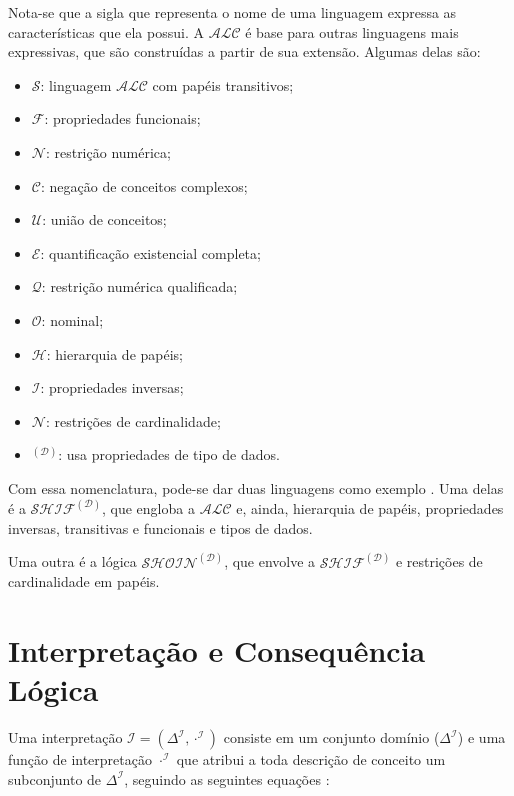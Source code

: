 Nota-se que a sigla que representa o nome de uma linguagem expressa as características que ela possui.
A $ \mathcal{ALC} $ é base para outras linguagens mais expressivas, que são construídas a partir de sua extensão. Algumas delas são:

\begin{itemize}
	\item $ \mathcal{S} $: linguagem $ \mathcal{ALC} $ com papéis transitivos;
	\item $ \mathcal{F} $: propriedades funcionais;
	\item $ \mathcal{N} $: restrição numérica;
	\item $ \mathcal{C} $: negação de conceitos complexos;
	\item $ \mathcal{U} $: união de conceitos;
	\item $ \mathcal{E} $: quantificação existencial completa;
	\item $ \mathcal{Q} $: restrição numérica qualificada;
	\item $ \mathcal{O} $: nominal;
	\item $ \mathcal{H} $: hierarquia de papéis;
	\item $ \mathcal{I} $: propriedades inversas;
	\item $ \mathcal{N} $: restrições de cardinalidade;
	\item $ ^\mathcal{(D)} $: usa propriedades de tipo de dados.
\end{itemize}

Com essa nomenclatura, pode-se dar duas linguagens como exemplo \citep{logicaResina}. Uma delas é a $ \mathcal{SHIF}^\mathcal{(D)} $, que engloba a $ \mathcal{ALC} $ e, ainda, hierarquia de papéis, propriedades inversas, transitivas e funcionais e tipos de dados.

Uma outra é a lógica $ \mathcal{SHOIN}^\mathcal{(D)}$, que envolve a  $ \mathcal{SHIF}^\mathcal{(D)} $ e restrições de cardinalidade em papéis.

\section{Interpretação e Consequência Lógica}

Uma interpretação $ \mathcal{I} = (\Delta^{\mathcal{I}}, \cdot^{\mathcal{I}})$ consiste em um conjunto domínio ($ \Delta^{\mathcal{I}} $) e uma função de interpretação $ \cdot^{\mathcal{I}} $ que atribui a toda descrição de conceito um subconjunto de $ \Delta^{\mathcal{I}} $, seguindo as seguintes equações \citep{logicaHorrocks}:

